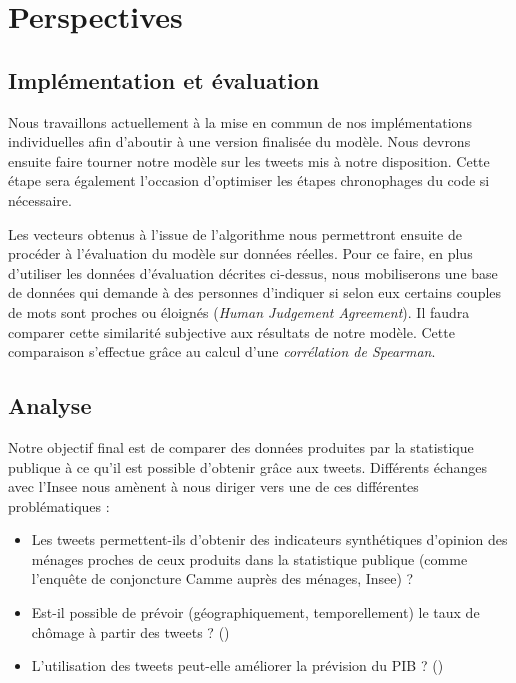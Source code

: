 \documentclass[11pt,french,french]{article}
\begin{document}
\normalsize

\section{Perspectives}\label{perspectives}

\subsection{Implémentation et
évaluation}\label{impluxe9mentation-et-uxe9valuation}

Nous travaillons actuellement à la mise en commun de nos implémentations
individuelles afin d'aboutir à une version finalisée du modèle. Nous
devrons ensuite faire tourner notre modèle sur les tweets mis à notre
disposition. Cette étape sera également l'occasion d'optimiser les
étapes chronophages du code si nécessaire.

Les vecteurs obtenus à l'issue de l'algorithme nous permettront ensuite
de procéder à l'évaluation du modèle sur données réelles. Pour ce faire,
en plus d'utiliser les données d'évaluation décrites ci-dessus, nous
mobiliserons une base de données qui demande à des personnes d'indiquer
si selon eux certains couples de mots sont proches ou éloignés
(\emph{Human Judgement Agreement}). Il faudra comparer cette similarité
subjective aux résultats de notre modèle. Cette comparaison s'effectue
grâce au calcul d'une \emph{corrélation de Spearman}.

\subsection{Analyse}\label{analyse}

Notre objectif final est de comparer des données produites par la
statistique publique à ce qu'il est possible d'obtenir grâce aux tweets.
Différents échanges avec l'Insee nous amènent à nous diriger vers une de
ces différentes problématiques :

\begin{itemize}
\item
  Les tweets permettent-ils d'obtenir des indicateurs synthétiques
  d'opinion des ménages proches de ceux produits dans la statistique
  publique (comme l'enquête de conjoncture Camme auprès des ménages,
  Insee) ?
\item
  Est-il possible de prévoir (géographiquement, temporellement) le taux
  de chômage à partir des tweets ? (\cite{Chomage})
\item
  L'utilisation des tweets peut-elle améliorer la prévision du PIB ?
  (\cite{Monde})
\end{itemize}
\end{document}
